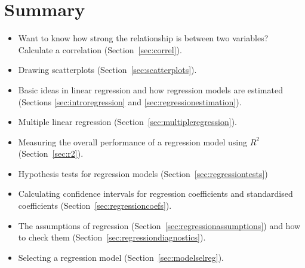 \begin{comment}
Okay, so that's the hypothesis test that we use to compare two regression models to one another. Now, how do we do it in jamovi? The answer is to use the `Model Builder' option and specify the Model 1 predictors \rtext{dan.sleep} and \rtext{day} in `Block 1' and then add the additional predictor from Model 2 (\rtext{baby.sleep}) in `Block 2', as in Figure \ref{fig:reg8}. This shows, in the `Model Comparisons' Table, that for the comparisons between Model 1 and Model 2, $F$(1,96) = 0.00, $p$ = 0.954. Since we have $p>.05$ we retain the null hypothesis (\rtext{M1}).  This approach to regression, in which we add all of our covariates into a null model, then {\it add} the variables of interest into an alternative model, and then compare the two models in a hypothesis testing framework, is often referred to as \keyterm{hierarchical regression}.

We can also use this `Model Comparison' option to display a table that shows the AIC and BIC for each model, making it easy to compare and identify which model has the lowest value, as in Figure \ref{fig:reg8}.
\end{comment}

\section{Summary}

\begin{itemize} \itemsep -2pt
\item Want to know how strong the relationship is between two variables? Calculate a correlation (Section~\ref{sec:correl}).
\item Drawing scatterplots (Section~\ref{sec:scatterplots}). 
\item Basic ideas in linear regression and how regression models are estimated (Sections \ref{sec:introregression} and \ref{sec:regressionestimation}).
\item Multiple linear regression (Section~\ref{sec:multipleregression}). 
\item Measuring the overall performance of a regression model using $R^2$ (Section~\ref{sec:r2}).
\item Hypothesis tests for regression models (Section~\ref{sec:regressiontests})
\item Calculating confidence intervals for regression coefficients and standardised coefficients (Section~\ref{sec:regressioncoefs}).
\item The assumptions of regression (Section~\ref{sec:regressionassumptions}) and how to check them (Section~\ref{sec:regressiondiagnostics}).
\item Selecting a regression model (Section~\ref{sec:modelselreg}).
\end{itemize}






